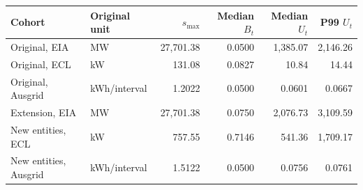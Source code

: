 \begin{tabular}{llrrrr}
\toprule
Cohort & Original unit & $s_{\max}$ & Median $B_t$ & Median $U_t$ & P99 $U_t$\\
\midrule
Original, EIA & MW & 27,701.38 & 0.0500 & 1,385.07 & 2,146.26\\
Original, ECL & kW & 131.08 & 0.0827 & 10.84 & 14.44\\
Original, Ausgrid & kWh/interval & 1.2022 & 0.0500 & 0.0601 & 0.0667\\
Extension, EIA & MW & 27,701.38 & 0.0750 & 2,076.73 & 3,109.59\\
New entities, ECL & kW & 757.55 & 0.7146 & 541.36 & 1,709.17\\
New entities, Ausgrid & kWh/interval & 1.5122 & 0.0500 & 0.0756 & 0.0761\\
\bottomrule
\end{tabular}
